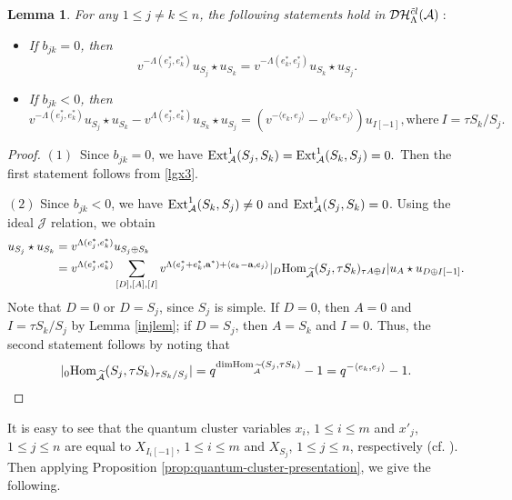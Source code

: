 \documentclass[reqno,12pt]{amsart}
\numberwithin{equation}{section}
\def\Ext{\mbox{\rm Ext}} \def\Hom{\mbox{\rm Hom}} \def\dim{\mbox{\rm dim}} \def\Iso{\mbox{\rm Iso}\,}\def\Ind{\mbox{\rm Ind}\,}
\def\lr#1{\langle #1\rangle} \def\fin{\hfill$\square$}  \def\lra{\longrightarrow} \def\mod{\mbox{\rm \textbf{mod}}\,}\def\Mod{\mbox{\rm mod}\,}\def\top{\mbox{\rm top}\,}\def\soc{\mbox{\rm soc}\,}
\theoremstyle{plain} %
\newtheorem{lemma}[theorem]{\bf Lemma}
\theoremstyle{definition} %
\begin{document}
\begin{lemma}\label{lem:gen-rel-quasi-commutation}
For any $1\leq j\neq k\leq n$, the following statements hold in $\mathcal {D}\mathcal {H}_\Lambda^{{\tilde{c}l}}({\mathcal{A}})$\,$:$
    \begin{itemize}
        \item[(1)] If $b_{jk}=0$, then
        \[
        v^{-\Lambda(e_j^\ast,e_k^\ast)}u_{S_j}\star u_{S_k}= v^{-\Lambda(e_k^\ast,e_j^\ast)}u_{S_k}\star u_{S_j}.
        \]
        \item[(2)] If $b_{jk}<0$, then
        \[
        v^{-\Lambda(e_j^\ast,e_k^\ast)}u_{S_j}\star u_{S_k}-v^{\Lambda(e_j^\ast,e_k^\ast)}u_{S_k}\star u_{S_j}=(v^{-\lr{e_k,e_j}}-v^{\lr{e_k,e_j}})u_{I [-1]},
        \text {where}~I=\tau S_k/S_j.
        \]
    \end{itemize}
\end{lemma}
\begin{proof}
$(1)$~Since $b_{jk}=0$, we have $\Ext^1_{\A}(S_j,S_k)=\Ext^1_{\A}(S_k,S_j)=0.$ Then the first statement follows from \eqref{lgx3}.

$(2)$ Since $b_{jk}<0$, we have $\Ext^1_{\A}(S_k,S_j)\neq 0$ and $\Ext^1_{\A}(S_j,S_k)=0$.
Using the ideal $\mathcal{J}$ relation, we obtain
    \begin{align*}
        u_{S_j}\star u_{S_k}&=v^{\Lambda(e_j^\ast,e_k^\ast)}u_{S_j\oplus S_k}\\
        &=v^{\Lambda(e_j^\ast,e_k^\ast)}\sum_{[D],[A],[I]}v^{\Lambda(e_j^\ast+e_k^\ast,{\bf a}^\ast)+\lr{e_k-{\bf a},e_j}}|_D\Hom_{\widetilde{\A}}(S_j,\tau S_k)_{\tau A\oplus I}|u_A\star u_{D\oplus I[-1]}.
    \end{align*}  Note that $D=0$ or $D=S_j$, since $S_j$ is simple. If $D=0$, then $A=0$ and $I=\tau S_k/S_j$ by Lemma \ref{injlem}; if $D=S_j$, then $A=S_k$ and $I=0$. Thus, the second
statement follows by noting that \[|_0\Hom_{\widetilde{\A}}(S_j,\tau S_k)_{\tau S_k/S_j}|=q^{{\rm dim} {\rm Hom}_{\widetilde{\A}}(S_j,\tau S_k)}-1=q^{-\lr{e_k,e_j}}-1.\]
\end{proof}

It is easy to see that the quantum cluster variables $x_i$, $1\leq i\leq m$ and $x'_j$, $1\leq j\leq n$ are equal to
$X_{I_i[-1]}$, $1\leq i\leq m$ and $X_{S_j}$, $1\leq j\leq n$, respectively (cf. \cite[Proposition 3.2]{FuZh}). Then applying Proposition \ref{prop:quantum-cluster-presentation}, we give the following.
\end{document}
